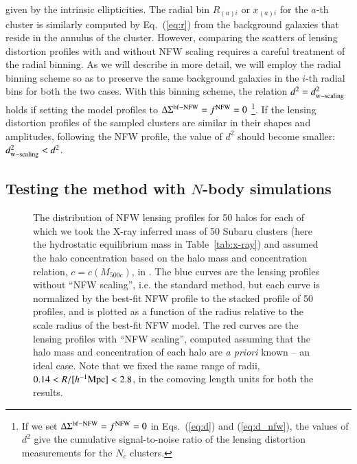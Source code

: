 \documentclass[iop, apj]{emulateapj}
\newcommand{\?}{\stackrel{?}{=}}
\begin{document}
given by the intrinsic ellipticities. The radial bin $R_{(a)i}$ or
$x_{(a)i}$ for the $a$-th cluster is similarly computed by
Eq.~(\ref{eq:r}) from the background galaxies that reside in the annulus
of the cluster. However, comparing the scatters of lensing distortion
profiles with and without NFW scaling requires a careful treatment of
the radial binning. As we will describe in more detail, we will employ
the radial binning scheme so as to preserve the same background galaxies
in the $i$-th radial bins for both the two cases. With this binning
scheme, the relation $d^2=d^2_{\rm w-scaling}$ holds if setting the
model profiles to $\Delta\Sigma^{\rm bf-NFW}=f^{\rm NFW}=0$ \footnote{If
we set $\Delta\Sigma^{\rm bf-NFW}=f^{\rm NFW}=0$ in Eqs.~(\ref{eq:d})
and (\ref{eq:d_nfw}), the values of $d^2$ give the cumulative
signal-to-noise ratio of the lensing distortion measurements for the
$N_c$ clusters.}.  If the lensing distortion profiles of the sampled
clusters are similar in their shapes and amplitudes, following the NFW
profile, the value of $d^2$ should become smaller: $d^2_{\rm
w-scaling}<d^2$.


\subsection{Testing the method with $N$-body simulations}
\label{sec:nbody}
%
 \begin{figure}
%
%
  \caption{The distribution of NFW lensing profiles for 50 halos for
  each of which we took the X-ray inferred mass of 50 Subaru clusters
  (here the hydrostatic equilibrium mass in Table~\ref{tab:x-ray}) and
  assumed the halo concentration based on the halo mass and
  concentration relation, $c=c(M_{500c})$, in \citet[][hereafter
  DK14]{DiemerKravtsov:14}. The blue curves are the lensing profiles
  without ``NFW scaling'', i.e. the standard method, but each curve is
  normalized by the best-fit NFW profile to the stacked profile of 50
  profiles, and is plotted as a function of the radius relative to the
  scale radius of the best-fit NFW model. The red curves are the lensing
  profiles with ``NFW scaling'', computed assuming that the halo mass
  and concentration of each halo are {\it a priori} known -- an ideal
  case. Note that we fixed the same range of radii, $0.14<R/[h^{-1}{\rm
  Mpc}]<2.8$, in the comoving length units for both the results. }
  \label{fig:test_nfw}
 \end{figure}
%
\end{document}
